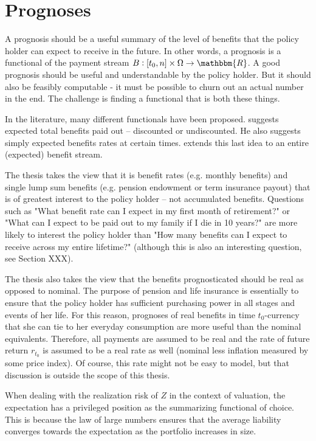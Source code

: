\documentclass{book}
\newcommand{\1}[1]{\mathbbm{1}_{\left\lbrace #1 \right\rbrace}}
\theoremstyle{break}
\theoremstyle{remark}
\numberwithin{equation}{section}
\begin{document}
\newpage

\chapter{Prognoses}

A prognosis should be a useful summary of the level of benefits that the policy holder can expect to receive in the future. In other words, a prognosis is a functional of the payment stream $B: [t_0,n] \times \Omega \to \mathbbm{R}$. A good prognosis should be useful and understandable by the policy holder. But it should also be feasibly computable - it must be possible to churn out an actual number in the end. The challenge is finding a functional that is both these things.

In the literature, many different functionals have been proposed. \cite{Norberg2001} suggests expected total benefits paid out -- discounted or undiscounted. He also suggests simply expected benefits rates at certain times. \cite{NinaReitzel} extends this last idea to an entire (expected) benefit stream.

The thesis takes the view that it is benefit rates (e.g. monthly benefits) and single lump sum benefits (e.g. pension endowment or term insurance payout) that is of greatest interest to the policy holder -- not accumulated benefits. Questions such as "What benefit rate can I expect in my first month of retirement?" or "What can I expect to be paid out to my family if I die in 10 years?" are more likely to interest the policy holder than "How many benefits can I expect to receive across my entire lifetime?" (although this is also an interesting question, see Section XXX).

The thesis also takes the view that the benefits prognosticated should be real as opposed to nominal. The purpose of pension and life insurance is essentially to ensure that the policy holder has sufficient purchasing power in all stages and events of her life. For this reason, prognoses of real benefits in time $t_0$-currency that she can tie to her everyday consumption are more useful than the nominal equivalents. Therefore, all payments are assumed to be real and the rate of future return $r_{t_0}$ is assumed to be a real rate as well (nominal less inflation measured by some price index). Of course, this rate might not be easy to model, but that discussion is outside the scope of this thesis.

When dealing with the realization risk of $Z$ in the context of valuation, the expectation has a privileged position as the summarizing functional of choice. This is because the law of large numbers ensures that the average liability converges towards the expectation as the portfolio increases in size.
\end{document}
